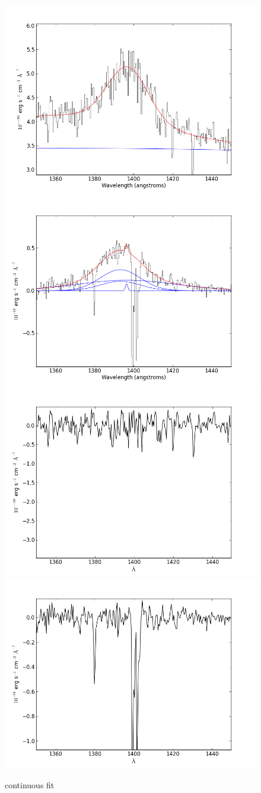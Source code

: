 \documentclass[usenatbib]{mn2e}
\begin{document}
\newpage



\begin{figure}
\begin{center}
\includegraphics[width=0.46\linewidth,angle=0]{SiIV_12.png}
\vspace{5mm}
\includegraphics[width=0.49\linewidth,angle=0]{SiIV_13.png}\\
\includegraphics[width=0.46\linewidth,angle=0]{SiIV_res_12.png}
\hspace{5mm}
\includegraphics[width=0.49\linewidth,angle=0]{SiIV_res_13.png}\\
\end{center} 
\caption{continuous fit \label{fig:landscape}}   
\end{figure}
\end{document}
